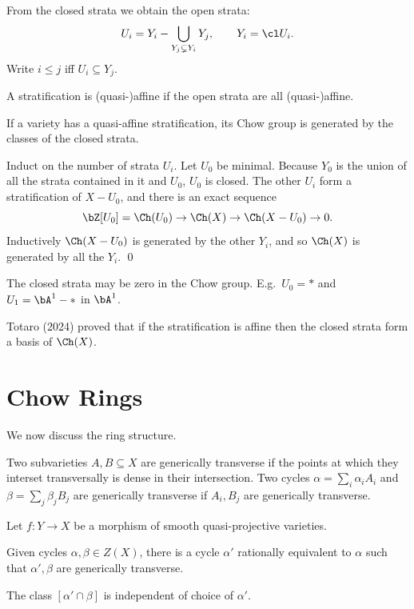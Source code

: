 From the closed strata we obtain the open strata:
$$ U_i = Y_i - \bigcup_{Y_j\subsetneq Y_i}Y_j,\qquad Y_i = \cl U_i . $$
Write $i\leq j$ iff $U_i\subseteq Y_j$.

\bdefn

    A stratification is {\emphcolor (quasi-)affine} if the open strata are all (quasi-)affine.

\edefn

\bprop

    If a variety has a quasi-affine stratification, its Chow group is generated by the classes of the closed strata.

\eprop

\bproof

    Induct on the number of strata $U_i$.
    Let $U_0$ be minimal.
    Because $Y_0$ is the union of all the strata contained in it and $U_0$, $U_0$ is closed.
    The other $U_i$ form a stratification of $X-U_0$, and there is an exact sequence
    $$ \bZ[U_0] = \Ch(U_0) \to \Ch(X) \to \Ch(X-U_0) \to 0 . $$
    Inductively $\Ch(X-U_0)$ is generated by the other $Y_i$, and so $\Ch(X)$ is generated by all the $Y_i$.
    \qed

\eproof

\bnote

    The closed strata may be zero in the Chow group.
    E.g.\ $U_0=*$ and $U_1=\bA^1-*$ in $\bA^1$.

    Totaro (2024) proved that if the stratification is affine then the closed strata form a basis of $\Ch(X)$.

\enote

\section{Chow Rings}

We now discuss the ring structure.

\bdefn

    Two subvarieties $A,B\subseteq X$ are {\emphcolor generically transverse} if the points at which they interset transversally
    is dense in their intersection.
    Two cycles $\alpha=\sum_i\alpha_iA_i$ and $\beta=\sum_j\beta_jB_j$ are generically transverse if $A_i,B_j$ are generically transverse.

\edefn

\bthrm[title={Moving lemma}]

    Let $f\colon Y\to X$ be a morphism of smooth quasi-projective varieties.
    \benum
        \item Given cycles $\alpha,\beta\in Z(X)$, there is a cycle $\alpha'$ rationally equivalent to $\alpha$ such that $\alpha',\beta$
        are generically transverse.
        \item The class $[\alpha'\cap\beta]$ is independent of choice of $\alpha'$.
    \eenum

